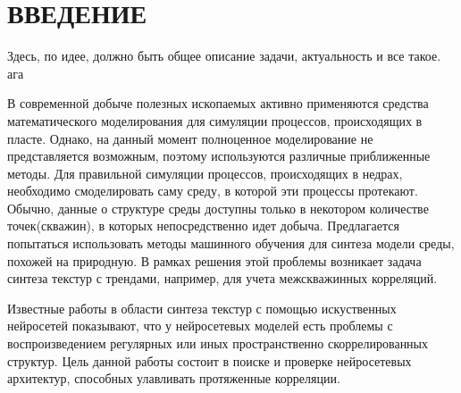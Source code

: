 \newpage
\section*{\hfil ВВЕДЕНИЕ \hfil}
	Здесь, по идее, должно быть общее описание задачи, актуальность и все такое. ага
	
	В современной добыче полезных ископаемых активно применяются средства математического моделирования для симуляции процессов, происходящих в пласте. Однако, на данный момент полноценное моделирование не представляется возможным, поэтому используются различные приближенные методы. Для правильной симуляции процессов, происходящих в недрах, необходимо смоделировать саму среду, в которой эти процессы протекают. Обычно, данные о структуре среды доступны только в некотором количестве точек(скважин), в которых непосредственно идет добыча. Предлагается попытаться использовать методы машинного обучения для синтеза модели среды, похожей на природную. В рамках решения этой проблемы возникает задача синтеза текстур с трендами, например, для учета межскважинных корреляций.
	
	Известные работы в области синтеза текстур с помощью искуственных нейросетей \cite{texture-synthesis-using-CNN, texture-networks} показывают, что у нейросетевых моделей есть проблемы с воспроизведением регулярных или иных пространственно скоррелированных структур. Цель данной работы состоит в поиске и проверке нейросетевых архитектур, способных улавливать протяженные корреляции.